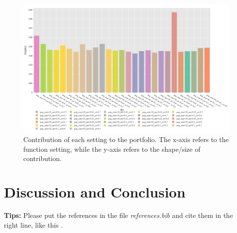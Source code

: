 \documentclass{article}
\begin{document}
\begin{figure}[h!]
    \centering
    \includegraphics[width=1\linewidth]{Graphs/Katsuura/Shapley_Values.png}
    \caption{Contribution of each setting to the portfolio. The x-axis refers to the function setting, while the y-axis refers to the shape/size of contribution. }
    \label{fig:shapley-katsuura}
\end{figure}



\section{Discussion and Conclusion}\label{sec:dis&res}


    
    
 
 \textbf{Tips:} Please put the references in the file \emph{references.bib} and cite them in the right line, like this \cite{hadash2018estimate}.


\clearpage
  
  
\end{document}
